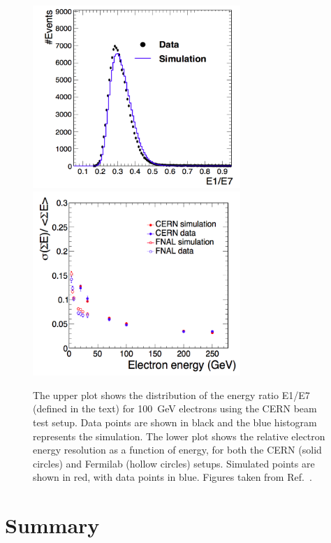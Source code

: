 \begin{figure}[h!]
  \centering
  \includegraphics[width=0.7\textwidth]{Figures/HGCAL/BeamTestShape.png}
  \includegraphics[width=0.7\textwidth]{Figures/HGCAL/BeamTestEnergy.png}
  \caption[Comparison of data and simulation in HGCAL beam tests.]
  {
    The upper plot shows the distribution of the energy ratio E1/E7 (defined in the text) 
    for \SI{100}{GeV} electrons using the CERN beam test setup.
    Data points are shown in black and the blue histogram represents the simulation.
    The lower plot shows the relative electron energy resolution as a function of energy, 
    for both the CERN (solid circles) and Fermilab (hollow circles) setups.
    Simulated points are shown in red, with data points in blue.
    Figures taken from Ref.~\cite{HGCAL}.
  }
  \label{fig:hgcal_BeamTest}
\end{figure}

\section{Summary}

